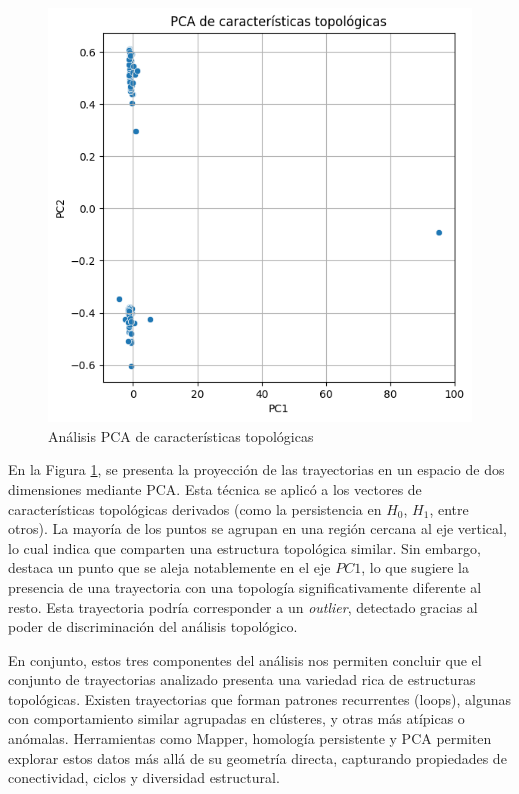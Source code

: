 \begin{figure}[htbp]
    \centering
    \includegraphics[width=0.75\linewidth]{images/pca_varias.png}
    \caption{Análisis PCA de características topológicas}
    \label{fig:pca_varias}
\end{figure}

En la Figura \ref{fig:pca_varias}, se presenta la proyección de las trayectorias en un espacio de dos dimensiones mediante PCA. Esta técnica se aplicó a los vectores de características topológicas derivados (como la persistencia en $H_0$, $H_1$, entre otros). La mayoría de los puntos se agrupan en una región cercana al eje vertical, lo cual indica que comparten una estructura topológica similar. Sin embargo, destaca un punto que se aleja notablemente en el eje $PC1$, lo que sugiere la presencia de una trayectoria con una topología significativamente diferente al resto. Esta trayectoria podría corresponder a un \textit{outlier}, detectado gracias al poder de discriminación del análisis topológico.

\vspace{0.4cm}

En conjunto, estos tres componentes del análisis nos permiten concluir que el conjunto de trayectorias analizado presenta una variedad rica de estructuras topológicas. Existen trayectorias que forman patrones recurrentes (loops), algunas con comportamiento similar agrupadas en clústeres, y otras más atípicas o anómalas. Herramientas como Mapper, homología persistente y PCA permiten explorar estos datos más allá de su geometría directa, capturando propiedades de conectividad, ciclos y diversidad estructural.

